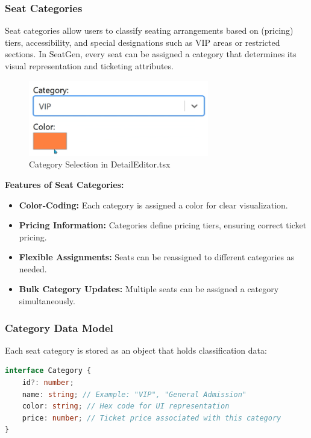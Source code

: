 \subsubsection{Seat Categories}

Seat categories allow users to classify seating arrangements based on (pricing) tiers, accessibility, and special designations such as VIP areas or restricted sections. In SeatGen, every seat can be assigned a category that determines its visual representation and ticketing attributes.

\begin{figure}[H]
    \centering
    \includegraphics[width=0.7\textwidth]{pics/DetailEditorCategory.png}
    \caption{Category Selection in DetailEditor.tsx}
    \label{fig:detail-editor-category}
\end{figure}

\textbf{Features of Seat Categories:}
\begin{itemize}
    \item \textbf{Color-Coding:} Each category is assigned a color for clear visualization.
    \item \textbf{Pricing Information:} Categories define pricing tiers, ensuring correct ticket pricing.
    \item \textbf{Flexible Assignments:} Seats can be reassigned to different categories as needed.
    \item \textbf{Bulk Category Updates:} Multiple seats can be assigned a category simultaneously.
\end{itemize}

\subsubsection{Category Data Model}

Each seat category is stored as an object that holds classification data:

\begin{lstlisting}[language=TypeScript, caption=Seat Category Data Model, label=lst:seat-category-model]
interface Category {
    id?: number;
    name: string; // Example: "VIP", "General Admission"
    color: string; // Hex code for UI representation
    price: number; // Ticket price associated with this category
}
\end{lstlisting}

